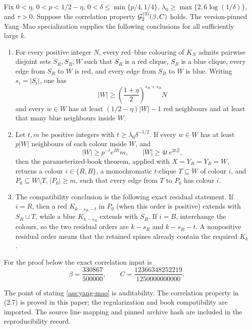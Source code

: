 \begin{assumption}\label{ass:yang-mao}
Fix \(0<\eta\), \(0<p<1/2-\eta\),
\(0<\delta\le\min\{p/4,1/4\}\),
\(\lambda_0\ge\max\{2,6\log(1/\delta)\}\), and \(\tau>0\).
Suppose the correlation property \(\mathcal G_2^{(3)}(\beta,C)\) holds.  The
version-pinned Yang--Mao specialization supplies the following conclusions
for all sufficiently large \(k\).
\begin{enumerate}[label=(\alph*)]
\item For every positive integer \(N\), every red--blue colouring of
      \(K_N\) admits pairwise disjoint sets \(S_R,S_B,W\) such that
      \(S_R\) is a red clique, \(S_B\) is a blue clique, every edge from
      \(S_R\) to \(W\) is red, and every edge from \(S_B\) to \(W\) is
      blue.  Writing \(s_i=|S_i|\), one has
      \[
      |W|\ge \left(\frac{1+\eta}{2}\right)^{s_R+s_B}N
      \tag{2.5}
      \]
      and every \(w\in W\) has at least
      \((1/2-\eta)|W|-1\) red neighbours and at least that many blue
      neighbours inside \(W\).
\item Let \(t,m\) be positive integers with
      \(t\ge\lambda_0\delta^{-1/2}\).  If every \(w\in W\) has at least
      \(p|W|\) neighbours of each colour inside \(W\), and
      \[
       |W|\ge p^{-t}e^{\Pi t}m,
       \qquad |W|\ge4t\,e^{2t\Xi},
       \tag{2.6}
      \]
      then the parameterized-book theorem, applied with
      \(X=Y_R=Y_B=W\), returns a colour \(i\in\{R,B\}\), a monochromatic
      \(t\)-clique \(T\subseteq W\) of colour \(i\), and
      \(P_0\subseteq W\setminus T\), \(|P_0|\ge m\), such that every edge
      from \(T\) to \(P_0\) has colour \(i\).
\item The compatibility conclusion is the following exact residual
      statement.  If \(i=R\), then a red
      \(K_{k-s_R-t}\) in \(P_0\) (when this order is positive) extends with
      \(S_R\cup T\), while a blue \(K_{k-s_B}\) extends with \(S_B\).
      If \(i=B\), interchange the colours, so the two residual orders are
      \(k-s_R\) and \(k-s_B-t\).  A nonpositive residual order means that
      the retained spines already contain the required \(K_k\).
\end{enumerate}
For the proof below the exact correlation input is
\[
 \beta=\frac{330867}{500000},\qquad
 C=\frac{12366348252219}{1250000000000}.
 \tag{2.7}\label{eq:correlation-input}
\]
\end{assumption}

The point of stating \cref{ass:yang-mao} is auditability.  The correlation
property in (2.7) is proved in this paper; the regularization and book
compatibility are imported.  The source line mapping and pinned archive hash
are included in the reproducibility record.

